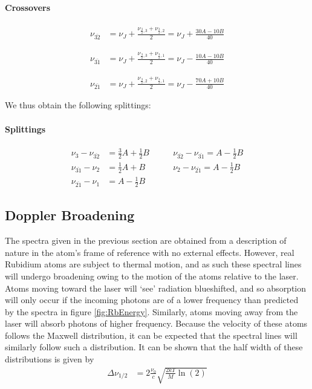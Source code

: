 \documentclass[12pt]{article}
\begin{document}
\paragraph{Crossovers}
\begin{align*}
\nu_{\bar{32}} &= \nu_J + \frac{\nu_{\frac{3}{2},3} + \nu_{\frac{3}{2},2}}{2} = \nu_J + \frac{30A-10B}{40}
\end{align*}

\begin{align*}
\nu_{\bar{31}} &= \nu_J + \frac{\nu_{\frac{3}{2},3} + \nu_{\frac{3}{2},1}}{2} = \nu_J - \frac{10A-10B}{40}
\end{align*}

\begin{align*}
\nu_{\bar{21}} &= \nu_J + \frac{\nu_{\frac{3}{2},2} + \nu_{\frac{3}{2},1}}{2} = \nu_J - \frac{70A+10B}{40}
\end{align*}

We thus obtain the following splittings:
\paragraph{Splittings}
\begin{align*}
\nu_{3}-\nu_{\bar{32}} &= \frac{3}{2}A+\frac{1}{2}B\qquad & \nu_{\bar{32}}-\nu_{\bar{31}}= A-\frac{1}{2}B\\
\nu_{\bar{31}}-\nu_{2} &= \frac{1}{2}A+B\qquad & \nu_{2}-\nu_{\bar{21}}= A-\frac{1}{2}B\\
\nu_{\bar{21}}-\nu_1 &= A-\frac{1}{2}B
\end{align*}

\subsection*{Doppler Broadening}

The spectra given in the previous section are obtained from a description of nature in the atom's frame of reference with no external effects.  However, real Rubidium atoms are subject to thermal motion, and as such these spectral lines will undergo broadening owing to the motion of the atoms relative to the laser.  Atoms moving toward the laser will `see' radiation blueshifted, and so absorption will only occur if the incoming photons are of a lower frequency than predicted by the spectra in figure \ref{fig:RbEnergy}.  Similarly, atoms moving away from the laser will absorb photons of higher frequency.  Because the velocity of these atoms follows the Maxwell distribution, it can be expected that the spectral lines will similarly follow such a distribution.  It can be shown that the half width of these distributions is given by 
\begin{align}
	\Delta \nu_{1/2} &= 2\frac{\nu_0}{c}\sqrt{\frac{2kT}{M}\ln(2)}
\end{align}
\end{document}
